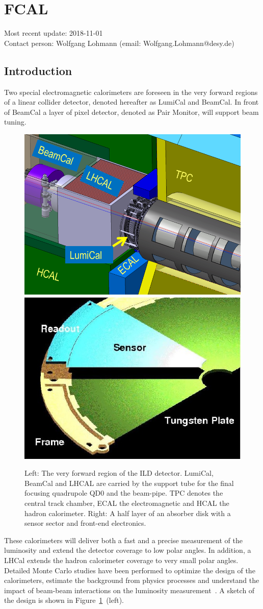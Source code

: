 \section{FCAL}
Most recent update: 2018-11-01 \\
Contact person: Wolfgang Lohmann (email: Wolfgang.Lohmann@desy.de)

\subsection{Introduction}
Two special electromagnetic calorimeters are foreseen in the very forward regions of a linear collider detector, denoted hereafter as
LumiCal and BeamCal. In front of BeamCal a layer of pixel detector, denoted as Pair Monitor, will support beam tuning.
\begin{figure}[hbp]
  \centering
   \includegraphics[width=0.45\columnwidth]{Calorimeter/FCAL/figs/forward_region_new} \hfill
   \includegraphics[width=0.45\columnwidth]{Calorimeter/FCAL/figs/BClayer}
  \caption{Left: The very forward region of the ILD detector.
  LumiCal, BeamCal and LHCAL are carried by
  the support tube for the final focusing quadrupole QD0 and the beam-pipe.
  TPC denotes the central track chamber, ECAL the electromagnetic and
  HCAL the hadron calorimeter.
  Right: A half layer of an absorber disk with a sensor sector and front-end electronics.}
  \label{fig:Forward_structure}
\end{figure}
These calorimeters will deliver both a fast and a precise measurement of the luminosity
and extend the detector coverage to low polar angles.
In addition, a LHCal extends the hadron calorimeter coverage to very small polar angles.
Detailed Monte Carlo studies have been performed to
optimize the design of the calorimeters, estimate the background from physics processes and understand the impact
of beam-beam interactions on the luminosity measurement~\cite{2010JInst...512002A}.
A sketch of the design is shown in Figure~\ref{fig:Forward_structure}~(left).

